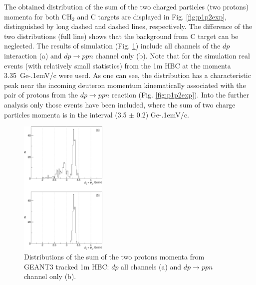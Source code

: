 \documentclass[twocolumn,epjc3]{svjour3}
\newcommand{\dpfrag} {\ensuremath{dp \rightarrow ppn}\xspace}
\newcommand{\GeVc}   {Ge\kern-.1emV/c\xspace}
\begin{document}
The obtained distribution of the sum of the two charged particles (two protons)
momenta for both CH$_2$ and C targets are displayed in Fig. \ref{fig:p1p2exp},
distinguished by long dashed and dashed lines, respectively. The difference of
the two distributions (full line) shows that the background from C target can be
neglected. The results of simulation (Fig. \ref{fig:p1p2sim}) include all
channels of the $dp$ interaction (a) and \dpfrag channel only (b). Note that for
the simulation real events (with relatively small statistics) from the 1m HBC at
the momenta 3.35~\GeVc were used. As one can see, the distribution has a
characteristic peak near the incoming deuteron momentum kinematically associated
with the pair of protons from the \dpfrag reaction (Fig. \ref{fig:p1p2exp}).
Into the further analysis only those events have been included, where the sum of
two charge particles momenta is in the interval (3.5 $\pm$ 0.2) \GeVc.


\begin{figure}[b]
  \centering
  \includegraphics[width=0.37\textwidth]{p1_plus_p2_2.pdf}    %
  \caption{Distributions of the sum of the two protons momenta from GEANT3
    tracked 1m HBC: $dp$ all channels (a) and \dpfrag channel only (b).}
  \label{fig:p1p2sim}
\end{figure}
\end{document}
